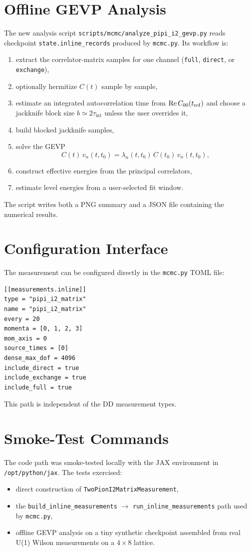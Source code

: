 \documentclass[11pt]{article}
\begin{document}
\section{Offline GEVP Analysis}
The new analysis script
\texttt{scripts/mcmc/analyze\_pipi\_i2\_gevp.py} reads checkpoint
\texttt{state.inline\_records} produced by \texttt{mcmc.py}. Its workflow is:
\begin{enumerate}
  \item extract the correlator-matrix samples for one channel
  (\texttt{full}, \texttt{direct}, or \texttt{exchange}),
  \item optionally hermitize $C(t)$ sample by sample,
  \item estimate an integrated autocorrelation time from
  $\mathrm{Re}\,C_{00}(t_{\rm ref})$ and choose a jackknife block size
  $b \simeq 2\tau_{\mathrm{int}}$ unless the user overrides it,
  \item build blocked jackknife samples,
  \item solve the GEVP
  \begin{equation}
    C(t)\,v_n(t,t_0) = \lambda_n(t,t_0)\,C(t_0)\,v_n(t,t_0),
  \end{equation}
  \item construct effective energies from the principal correlators,
  \item estimate level energies from a user-selected fit window.
\end{enumerate}
The script writes both a PNG summary and a JSON file containing the numerical
results.

\section{Configuration Interface}
The measurement can be configured directly in the \texttt{mcmc.py} TOML file:
\begin{verbatim}
[[measurements.inline]]
type = "pipi_i2_matrix"
name = "pipi_i2_matrix"
every = 20
momenta = [0, 1, 2, 3]
mom_axis = 0
source_times = [0]
dense_max_dof = 4096
include_direct = true
include_exchange = true
include_full = true
\end{verbatim}
This path is independent of the DD measurement types.

\section{Smoke-Test Commands}
The code path was smoke-tested locally with the JAX environment in
\texttt{/opt/python/jax}. The tests exercised:
\begin{itemize}
  \item direct construction of \texttt{TwoPionI2MatrixMeasurement},
  \item the \texttt{build\_inline\_measurements} $\rightarrow$
  \texttt{run\_inline\_measurements} path used by \texttt{mcmc.py},
  \item offline GEVP analysis on a tiny synthetic checkpoint assembled from real
  U(1) Wilson measurements on a $4\times 8$ lattice.
\end{itemize}
\end{document}
